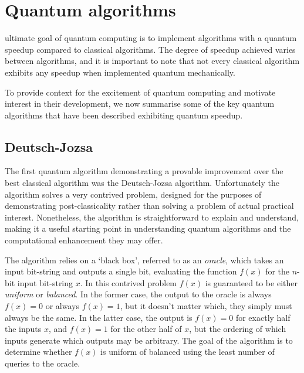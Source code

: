%
%

\section{Quantum algorithms} \label{sec:quantum_algs}

 ultimate goal of quantum computing is to implement algorithms with a quantum speedup compared to classical algorithms. The degree of speedup achieved varies between algorithms, and it is important to note that not every classical algorithm exhibits any speedup when implemented quantum mechanically.

To provide context for the excitement of quantum computing and motivate interest in their development, we now summarise some of the key quantum algorithms that have been described exhibiting quantum speedup.

%
%

\subsection{Deutsch-Jozsa} 

The first quantum algorithm demonstrating a provable improvement over the best classical algorithm was the Deutsch-Jozsa algorithm\cite{bib:DeutschJozsa92}. Unfortunately the algorithm solves a very contrived problem, designed for the purposes of demonstrating post-classicality rather than solving a problem of actual practical interest. Nonetheless, the algorithm is straightforward to explain and understand, making it a useful starting point in understanding quantum algorithms and the computational enhancement they may offer.

The algorithm relies on a `black box', referred to as an \textit{oracle}, which takes an input bit-string and outputs a single bit, evaluating the function $f(x)$ for the $n$-bit input bit-string $x$. In this contrived problem $f(x)$ is guaranteed to be either \textit{uniform} or \textit{balanced}. In the former case, the output to the oracle is always \mbox{$f(x)=0$} or always \mbox{$f(x)=1$}, but it doesn't matter which, they simply must always be the same. In the latter case, the output is \mbox{$f(x)=0$} for exactly half the inputs $x$, and \mbox{$f(x)=1$} for the other half of $x$, but the ordering of which inputs generate which outputs may be arbitrary. The goal of the algorithm is to determine whether $f(x)$ is uniform of balanced using the least number of queries to the oracle.

